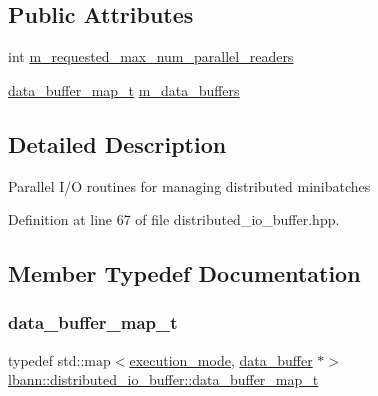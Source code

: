 \subsection*{Public Attributes}
\begin{DoxyCompactItemize}
\item 
int \hyperlink{classlbann_1_1distributed__io__buffer_aa14580fd9d0e8806dc161745525a60dc}{m\+\_\+requested\+\_\+max\+\_\+num\+\_\+parallel\+\_\+readers}
\item 
\hyperlink{classlbann_1_1distributed__io__buffer_a7567d3d06f96b001c118f9979bebb0b9}{data\+\_\+buffer\+\_\+map\+\_\+t} \hyperlink{classlbann_1_1distributed__io__buffer_a59ef8621c57755f73671b782e11dbe89}{m\+\_\+data\+\_\+buffers}
\end{DoxyCompactItemize}


\subsection{Detailed Description}
Parallel I/O routines for managing distributed minibatches 

Definition at line 67 of file distributed\+\_\+io\+\_\+buffer.\+hpp.



\subsection{Member Typedef Documentation}
\mbox{\label{classlbann_1_1distributed__io__buffer_a7567d3d06f96b001c118f9979bebb0b9}} 
\subsubsection{\texorpdfstring{data\+\_\+buffer\+\_\+map\+\_\+t}{data\_buffer\_map\_t}}
{\footnotesize\ttfamily typedef std\+::map$<$\hyperlink{base_8hpp_a2781a159088df64ed7d47cc91c4dc0a8}{execution\+\_\+mode}, \hyperlink{classlbann_1_1data__buffer}{data\+\_\+buffer} $\ast$$>$ \hyperlink{classlbann_1_1distributed__io__buffer_a7567d3d06f96b001c118f9979bebb0b9}{lbann\+::distributed\+\_\+io\+\_\+buffer\+::data\+\_\+buffer\+\_\+map\+\_\+t}}



